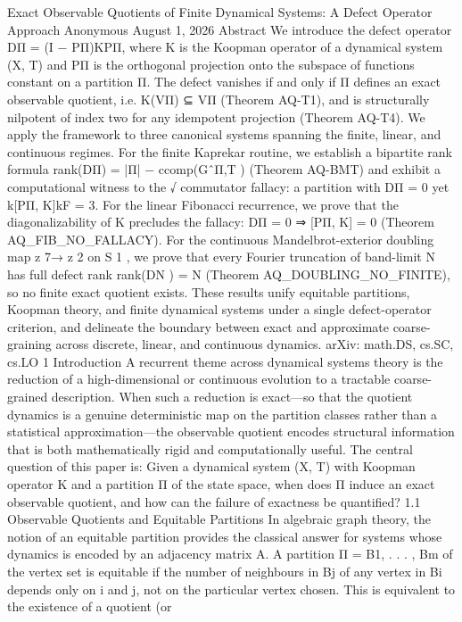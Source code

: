 Exact Observable Quotients of Finite Dynamical Systems:
A Defect Operator Approach
Anonymous
August 1, 2026
Abstract
We introduce the defect operator DΠ = (I − PΠ)KPΠ, where K is the Koopman operator of
a dynamical system (X, T) and PΠ is the orthogonal projection onto the subspace of functions
constant on a partition Π. The defect vanishes if and only if Π defines an exact observable
quotient, i.e. K(VΠ) ⊆ VΠ (Theorem AQ-T1), and is structurally nilpotent of index two for any
idempotent projection (Theorem AQ-T4). We apply the framework to three canonical systems
spanning the finite, linear, and continuous regimes. For the finite Kaprekar routine, we establish
a bipartite rank formula rank(DΠ) = |Π| − ccomp(GˆΠ,T ) (Theorem AQ-BMT) and exhibit a
computational witness to the
√
commutator fallacy: a partition with DΠ = 0 yet k[PΠ, K]kF =
3. For the linear Fibonacci recurrence, we prove that the diagonalizability of K precludes
the fallacy: DΠ = 0 ⇒ [PΠ, K] = 0 (Theorem AQ_FIB_NO_FALLACY). For the continuous
Mandelbrot-exterior doubling map z 7→ z
2 on S
1
, we prove that every Fourier truncation of
band-limit N has full defect rank rank(DN ) = N (Theorem AQ_DOUBLING_NO_FINITE),
so no finite exact quotient exists. These results unify equitable partitions, Koopman theory, and
finite dynamical systems under a single defect-operator criterion, and delineate the boundary
between exact and approximate coarse-graining across discrete, linear, and continuous dynamics.
arXiv: math.DS, cs.SC, cs.LO
1 Introduction
A recurrent theme across dynamical systems theory is the reduction of a high-dimensional or
continuous evolution to a tractable coarse-grained description. When such a reduction is exact—so
that the quotient dynamics is a genuine deterministic map on the partition classes rather than
a statistical approximation—the observable quotient encodes structural information that is both
mathematically rigid and computationally useful. The central question of this paper is:
Given a dynamical system (X, T) with Koopman operator K and a partition Π of the
state space, when does Π induce an exact observable quotient, and how can the failure
of exactness be quantified?
1.1 Observable Quotients and Equitable Partitions
In algebraic graph theory, the notion of an equitable partition provides the classical answer for
systems whose dynamics is encoded by an adjacency matrix A. A partition Π = {B1, . . . , Bm} of
the vertex set is equitable if the number of neighbours in Bj of any vertex in Bi depends only on i
and j, not on the particular vertex chosen. This is equivalent to the existence of a quotient (or
